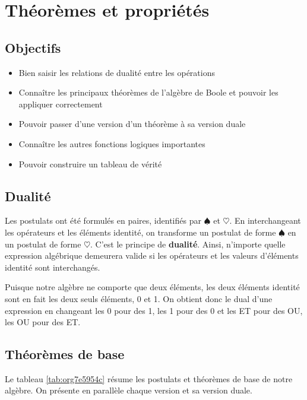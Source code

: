 \documentclass[11pt]{article}
\begin{document}
\section{Théorèmes et propriétés}
\label{sec:orga7fef6f}
\subsection{Objectifs}
\label{sec:org077f12b}
\begin{itemize}
\item Bien saisir les relations de dualité entre les opérations
\item Connaître les principaux théorèmes de l'algèbre de Boole et pouvoir
les appliquer correctement
\item Pouvoir passer d'une version d'un théorème à sa version duale
\item Connaître les autres fonctions logiques importantes
\item Pouvoir construire un tableau de vérité
\end{itemize}

\subsection{Dualité}
\label{sec:org80dfb6b}

Les postulats ont été formulés en paires, identifiés par \(\spadesuit\) et
\(\heartsuit\). En interchangeant les opérateurs et les éléments identité, on
transforme un postulat de forme \(\spadesuit\) en un postulat de forme
\(\heartsuit\). C'est le principe de \textbf{dualité}. Ainsi, n'importe quelle
expression algébrique demeurera valide si les opérateurs et les
valeurs d'éléments identité sont interchangés.

Puisque notre algèbre ne comporte que deux éléments, les deux éléments
identité sont en fait les deux seuls éléments, 0 et 1. On obtient donc
le dual d'une expression en changeant les 0 pour des 1, les 1 pour des
0 et les ET pour des OU, les OU pour des ET.

\subsection{Théorèmes de base}
\label{sec:org36f315f}

Le tableau \ref{tab:org7e5954c} résume les postulats et théorèmes de base de
notre algèbre. On présente en parallèle chaque version et sa version
duale.
\end{document}
